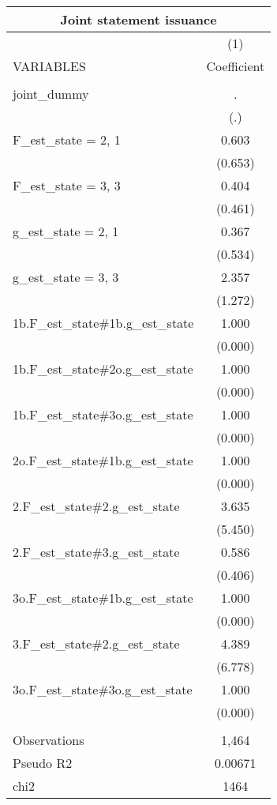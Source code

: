 \documentclass[]{article}
\begin{document}
\begin{tabular}{lc}
\multicolumn{2}{c}{Joint statement issuance} \\ \hline
 & (1) \\
VARIABLES & Coefficient \\ \hline
 &  \\
joint\_dummy & . \\
 & (.) \\
F\_est\_state = 2, 1 & 0.603 \\
 & (0.653) \\
F\_est\_state = 3, 3 & 0.404 \\
 & (0.461) \\
g\_est\_state = 2, 1 & 0.367 \\
 & (0.534) \\
g\_est\_state = 3, 3 & 2.357 \\
 & (1.272) \\
1b.F\_est\_state\#1b.g\_est\_state & 1.000 \\
 & (0.000) \\
1b.F\_est\_state\#2o.g\_est\_state & 1.000 \\
 & (0.000) \\
1b.F\_est\_state\#3o.g\_est\_state & 1.000 \\
 & (0.000) \\
2o.F\_est\_state\#1b.g\_est\_state & 1.000 \\
 & (0.000) \\
2.F\_est\_state\#2.g\_est\_state & 3.635 \\
 & (5.450) \\
2.F\_est\_state\#3.g\_est\_state & 0.586 \\
 & (0.406) \\
3o.F\_est\_state\#1b.g\_est\_state & 1.000 \\
 & (0.000) \\
3.F\_est\_state\#2.g\_est\_state & 4.389 \\
 & (6.778) \\
3o.F\_est\_state\#3o.g\_est\_state & 1.000 \\
 & (0.000) \\
 &  \\
Observations & 1,464 \\
Pseudo R2 & 0.00671 \\
 chi2 & 1464 \\ \hline
\end{tabular}
\end{document}
